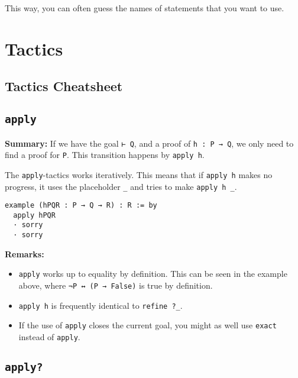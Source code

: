 \documentclass{memoir}
\begin{document}
This way, you can often guess the names of statements that you want to use.





\chapter{Tactics}



\section{Tactics Cheatsheet}





\section{\Verb|apply|}

\textbf{Summary:} If we have the goal \Verb|⊢ Q|, and a proof of \Verb|h : P → Q|, we only need to find a proof for \Verb|P|. This transition happens by \Verb|apply h|.



The \Verb|apply|-tactics works iteratively. This means that if \Verb|apply h| makes no progress, it uses the placeholder \Verb|_| and tries to make \Verb|apply h _|.

\begin{verbatim}
example (hPQR : P → Q → R) : R := by
  apply hPQR
  · sorry
  · sorry

\end{verbatim}



\textbf{Remarks:}

\begin{itemize}
\item \Verb|apply| works up to equality by definition. This can be seen in the example above, where \Verb|¬P ↔ (P → False)| is true by definition.\item \Verb|apply h| is frequently identical to \Verb|refine ?_|.\item If the use of \Verb|apply| closes the current goal, you might as well use \Verb|exact| instead of \Verb|apply|.

\end{itemize}




\section{\Verb|apply?|}
\end{document}
